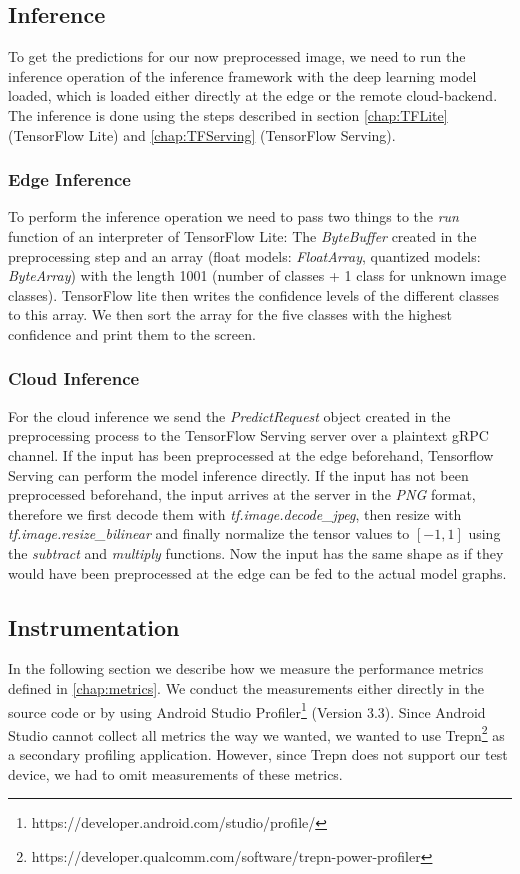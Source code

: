 

\subsection{Inference}
To get the predictions for our now preprocessed image, we need to run the inference operation of the inference framework with the deep learning model loaded, which is loaded either directly at the edge or the remote cloud-backend. 
The inference is done using the steps described in section \ref{chap:TFLite} (TensorFlow Lite) and \ref{chap:TFServing} (TensorFlow Serving).
\subsubsection{Edge Inference}
To perform the inference operation we need to pass two things to the \emph{run} function of an interpreter of TensorFlow Lite: The \emph{ByteBuffer} created in the preprocessing step and an array (float models: \emph{FloatArray}, quantized models: \emph{ByteArray}) with the length 1001 (number of classes + 1 class for unknown image classes). TensorFlow lite then writes the confidence levels of the different classes to this array. We then sort the array for the five classes with the highest confidence and print them to the screen.

\subsubsection{Cloud Inference}
\label{chap:CloudInfImpl}

For the cloud inference we send the \emph{PredictRequest} object created in the preprocessing process to the TensorFlow Serving server over a plaintext gRPC channel.
If the input has been preprocessed at the edge beforehand, Tensorflow Serving can perform the model inference directly.
If the input has not been preprocessed beforehand, the input arrives at the server in the \emph{PNG} format, therefore we first decode them with \emph{tf.image.decode\_jpeg}, then resize with \emph{tf.image.resize\_bilinear} and finally normalize the tensor values to $[-1,1]$ using the \emph{subtract} and \emph{multiply} functions. Now the input has the same shape as if they would have been preprocessed at the edge can be fed to the actual model graphs.

\subsection{Instrumentation}
\label{chap:insta_measurements}
In the following section we describe how we measure the performance metrics defined in \ref{chap:metrics}.
We conduct the measurements either directly in the source code or by using Android Studio Profiler\footnote{https://developer.android.com/studio/profile/} (Version 3.3). Since Android Studio cannot collect all metrics the way we wanted, we wanted to use Trepn\footnote{https://developer.qualcomm.com/software/trepn-power-profiler} as a secondary profiling application. However, since Trepn does not support our test device, we had to omit measurements of these metrics.

